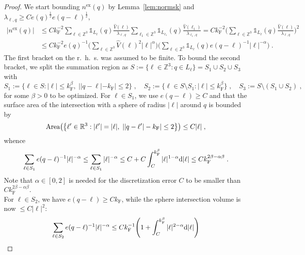 \documentclass[12pt,a4paper]{article}
\numberwithin{equation}{section}
\newcommand{\1}{\mathbb{I}}
\newcommand{\di}{\textnormal{d}}
\newcommand{\ex}{\mathrm{ex}}
\newcommand{\F}{\mathrm{F}}
\newcommand{\Zstar}{\mathbb{Z}^3} %
\newcommand{\R}{\mathbb{R}}
\newcommand{\Z}{\mathbb{Z}}
\newcommand{\half}{\frac{1}{2}}
\theoremstyle{plain}
\theoremstyle{definition}
\theoremstyle{remark}
\theoremstyle{plain}
\theoremstyle{definition}
\theoremstyle{remark}
\begin{document}
\begin{proof}
We start bounding $ n^{\ex}(q) $ by Lemma~\ref{lem:normsk} and $ \lambda_{\ell,q} \ge C e(q)^{\half} e(q-\ell)^{\half} $,
\begin{align}
	|n^{\ex}(q)|
	&\leq C k_{\F}^{-2}
		\sum_{\ell \in \Zstar} \mathds{1}_{L_\ell}(q) \frac{\hat{V}(\ell)}{\lambda_{\ell,q}}
		\sum_{\ell_1 \in \Zstar} \mathds{1}_{L_{\ell_1}}(q) \frac{\hat{V}(\ell_1)}{\lambda_{\ell_1,q}}
	= C k_{\F}^{-2}
		\Bigg( \sum_{\ell \in \Zstar} \mathds{1}_{L_\ell}(q) \frac{\hat{V}(\ell)}{\lambda_{\ell,q}} \Bigg)^2 \nonumber\\
	&\leq C k_{\F}^{-2} e(q)^{-1}
		\Bigg( \sum_{\ell \in \Zstar} \hat{V}(\ell)^2 |\ell|^{\alpha} \Bigg)
		\Bigg( \sum_{\ell \in \Zstar} \mathds{1}_{L_\ell}(q) e(q-\ell)^{-1} |\ell|^{-\alpha} \Bigg) \;.
\end{align}
The first bracket on the r.~h.~s. was assumed to be finite. To bound the second bracket, we split the summation region as $ S := \{ \ell \in \Zstar : q \in L_\ell \} = S_1 \cup S_2 \cup S_3 $ with
\begin{equation}
	S_1 := \{ \ell \in S : |\ell| \le k_{\F}^\beta, \; ||q-\ell|-k_{\F}| \le 2 \} \;, \quad
	S_2 := \{ \ell \in S \setminus S_1 : |\ell| \le k_{\F}^\beta \} \;, \quad
	S_3 := S \setminus (S_1 \cup S_2) \;,
\end{equation}
for some $ \beta > 0 $ to be optimized. For $ \ell \in S_1 $, we use $ e(q-\ell) \ge C $ and that the surface area of the intersection with a sphere of radius $ |\ell| $ around $ q $ is bounded by
\begin{equation*}
	\textnormal{Area} \big( \big\{ \ell' \in \R^3 : |\ell'| = |\ell|, \; ||q-\ell'|-k_{\F}| \le 2 \big\} \big)
	\leq C |\ell| \;,
\end{equation*}
whence
\begin{equation}
	\sum_{\ell \in S_1} e(q-\ell)^{-1} |\ell|^{-\alpha}
	\leq \sum_{\ell \in S_1} |\ell|^{-\alpha}
	\leq C + C \int_C^{k_{\F}^\beta} |\ell|^{1-\alpha}  \di |\ell|
	\le C k_{\F}^{2 \beta - \alpha \beta} \;.
\end{equation}
Note that $ \alpha \in [0,2] $ is needed for the discretization error $ C $ to be smaller than $C k_{\F}^{2 \beta - \alpha \beta} $.\\
For $ \ell \in S_2 $, we have $ e(q-\ell) \ge C k_{\F} $, while the sphere intersection volume is now $ \leq C |\ell|^2 $:
\begin{equation}
	\sum_{\ell \in S_2} e(q-\ell)^{-1} |\ell|^{-\alpha}
	\leq C k_{\F}^{-1} \Bigg( 1 + \int_C^{k_{\F}^\beta} |\ell|^{2-\alpha} \di |\ell| \Bigg)

\end{equation}
\end{proof}
\end{document}
